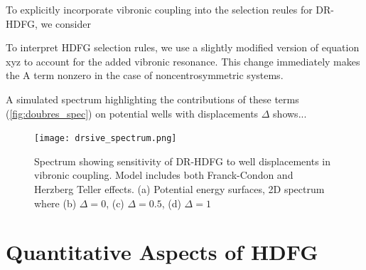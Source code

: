 \documentclass[aip, jcp, reprint, twocolumn]{revtex4-2}
\begin{document}
To explicitly incorporate vibronic coupling into the selection reules for DR-HDFG, we consider 

To interpret HDFG selection rules, we use a slightly modified version of equation xyz to account for the added vibronic resonance. 
This change immediately makes the A term nonzero in the case of noncentrosymmetric systems.

A simulated spectrum highlighting the contributions of these terms (\autoref{fig:doubres_spec}) on potential wells with displacements $\Delta$ shows... 
\begin{figure}[!htbp]
	\centering
	\texttt{[image: drsive\_spectrum.png]}
	\caption{Spectrum showing sensitivity of DR-HDFG to well displacements in vibronic coupling.
		Model includes both Franck-Condon and Herzberg Teller effects.
		(a) Potential energy surfaces, 2D spectrum where (b) $\Delta = 0$, (c) $\Delta = 0.5$, (d) $\Delta = 1$}
	\label{fig:doubres_spec}
\end{figure}


\section{Quantitative Aspects of HDFG}\label{quant}
\end{document}

